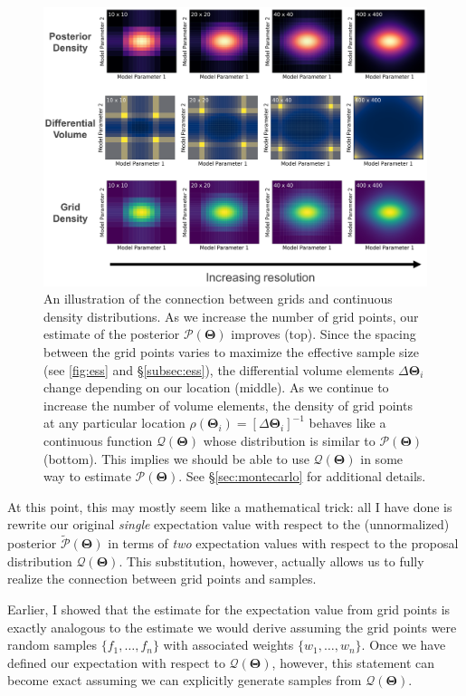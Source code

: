 \documentclass[12pt, titlepage]{article}
\newcommand{\params}{\ensuremath{\boldsymbol\Theta}}
\newcommand{\posterior}{\ensuremath{\mathcal{P}}}
\newcommand{\proposal}{\ensuremath{\mathcal{Q}}}
\begin{document}
\begin{figure}
\begin{center}
\includegraphics[width=\textwidth]{figures/fig6.png}
\end{center}
\caption{An illustration of the connection between grids and
continuous density distributions. As we increase the number
of grid points, our estimate of the posterior $\posterior(\params)$
improves (top). Since the spacing between the grid points varies
to maximize the effective sample size (see \autoref{fig:ess} and
\S\ref{subsec:ess}), the differential volume elements $\Delta \params_i$
change depending on our location (middle). As we continue to
increase the number of volume elements, the density of grid
points at any particular location 
$\rho(\params_i) = [\Delta \params_i]^{-1}$ 
behaves like a continuous function $\proposal(\params)$
whose distribution is similar to $\posterior(\params)$ (bottom).
This implies we should be able to use $\proposal(\params)$
in some way to estimate $\posterior(\params)$.
See \S\ref{sec:montecarlo} for additional details.
}\label{fig:density}
\end{figure}

At this point, this may mostly seem like a mathematical trick:
all I have done is rewrite our original \textit{single} 
expectation value with respect to the (unnormalized)
posterior $\tilde{\posterior}(\params)$ in terms of \textit{two}
expectation values with respect to the proposal distribution
$\proposal(\params)$. 
This substitution, however, actually allows us to fully realize 
the connection between grid points and samples.

Earlier, I showed that the estimate for the expectation
value from grid points is exactly analogous to the estimate
we would derive assuming the grid points were random samples
$\{ f_1, \dots, f_n \}$ with associated weights
$\{ w_1, \dots, w_n \}$. Once we have defined our
expectation with respect to $\proposal(\params)$, however,
this statement can become exact assuming we can explicitly generate
samples from $\proposal(\params)$.
\end{document}
